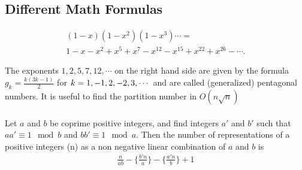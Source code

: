 \begin{multicols*}{2}
\subsection{Different Math Formulas}
\begin{multline*}
\displaystyle (1 - x)(1 - x ^ 2)(1 - x^3)\cdots = \\ 1 - x - x^2 + x^5 + x^7 - x^{12} - x^{15} + x^{22} + x^{26} - \cdots.
\end{multline*}

The exponents $\displaystyle 1, 2, 5, 7, 12,\cdots$ on the right hand side are given by the formula $g_k = \frac{k(3k - 1)}{2}$ for $\displaystyle \displaystyle k = 1, -1, 2, -2, 3, \cdots$ and are called (generalized) pentagonal numbers.
It is useful to find the partition number in $O(n \sqrt{n})$ \\ \\
Let $\displaystyle a$ and $b$ be coprime positive integers, and find integers $\displaystyle a{\prime}$ and $b{\prime}$ such that $\displaystyle aa{\prime} \equiv 1 \mod b$ and $bb{\prime} \equiv 1 \mod a$. Then the number of representations of a positive integers (n) as a non negative linear combination of $\displaystyle a$ and $b$ is 
\begin{multline*}
\displaystyle \frac{n}{ab}-\Big\{\frac{b{\prime} n}{a}\Big\}-\Big\{\frac{a{\prime} n}{b}\Big\} + 1
\end{multline*}

\end{multicols*}
